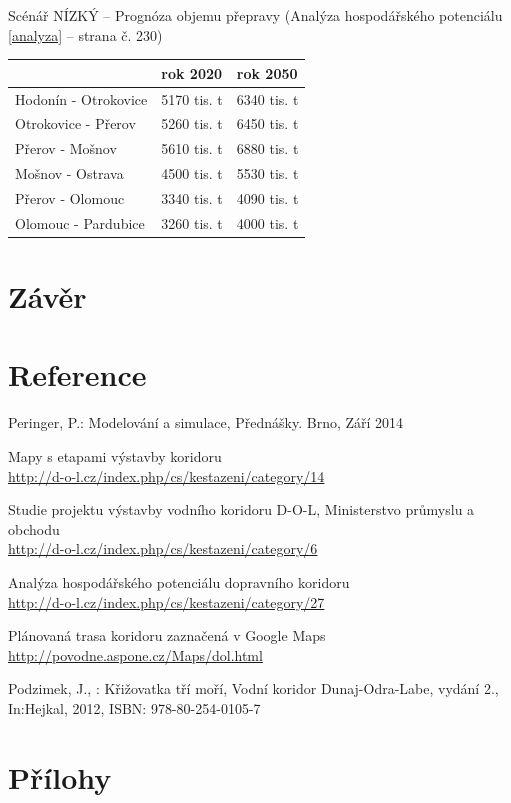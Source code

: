 \documentclass[11pt,a4paper]{article}
\begin{document}
    \noindent 
    Scénář NÍZKÝ -- Prognóza objemu přepravy (Analýza hospodářského
    potenciálu \ref{analyza} -- strana č. 230)
    \begin{center}
      \begin{tabular}{| l | l | l |}
        \hline
        & rok 2020 & rok 2050 \\ \hline
        Hodonín - Otrokovice & 5170 tis. t & 6340 tis. t \\ \hline
        Otrokovice - Přerov & 5260 tis. t & 6450 tis. t \\ \hline
        Přerov - Mošnov & 5610 tis. t & 6880 tis. t \\ \hline
        Mošnov - Ostrava & 4500 tis. t & 5530 tis. t \\ \hline
        Přerov - Olomouc & 3340 tis. t & 4090 tis. t \\ \hline
        Olomouc - Pardubice & 3260 tis. t & 4000 tis. t \\ \hline
        \end{tabular}
    \end{center}

  \section{Závěr}

  \section{Reference}

    \begin{enumerate}[label={[\arabic*]}]
      \item Peringer, P.: Modelování a simulace, Přednášky. Brno, Září 2014
        \label{peringer}
      \item Mapy s etapami výstavby koridoru \\
        \href{http://d-o-l.cz/index.php/cs/kestazeni/category/14}
        {http://d-o-l.cz/index.php/cs/kestazeni/category/14} \label{mapa}
      \item Studie projektu výstavby vodního koridoru D-O-L,
            Ministerstvo průmyslu a obchodu \\
        \href{http://d-o-l.cz/index.php/cs/kestazeni/category/6}
             {http://d-o-l.cz/index.php/cs/kestazeni/category/6} \label{studie}
      \item Analýza hospodářského potenciálu dopravního koridoru \\
        \href{http://d-o-l.cz/index.php/cs/kestazeni/category/27}
             {http://d-o-l.cz/index.php/cs/kestazeni/category/27} \label{analyza}
      \item Plánovaná trasa koridoru zaznačená v Google Maps \\
        \href{http://povode.aspone.cz/Maps/dol.html}
             {http://povodne.aspone.cz/Maps/dol.html} \label{google-mapa}
      \item Podzimek, J., : Křižovatka tří moří, Vodní koridor Dunaj-Odra-Labe,
            vydání 2., In:Hejkal, 2012, ISBN: 978-80-254-0105-7 \label{kniha}
    \end{enumerate}

  \appendix
  \newpage

  \section{Přílohy}

  
\end{document}
